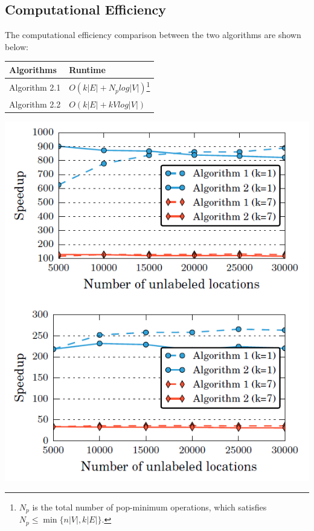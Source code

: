 \documentclass[a0,landscape]{a0poster}
\begin{document}
\begin{multicols}{4}
\section*{Computational Efficiency}
The computational efficiency comparison between the two algorithms are shown below:
\color{black}
\begin{center}
\begin{tabular}{l l}
\toprule
\textbf{Algorithms} & \textbf{Runtime}\\
\midrule
Algorithm 2.1 & $O(k|E|+N_plog|V|)$\footnote{$N_p$ is the total number of pop-minimum operations, which satisfies $N_p \leq \min\{n|V|,k|E|\}$.} \\
\color{red}Algorithm 2.2 & \color{red}$O(k|E|+kVlog|V|)$\\
\bottomrule
\end{tabular}
\end{center}
\normalsize
    \begin{center}
        \includegraphics[width=0.8\linewidth]{cmp.png}
    \end{center}




\end{multicols}
\end{document}
